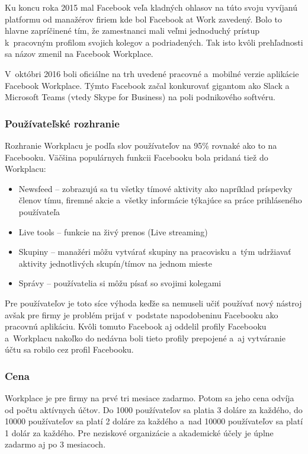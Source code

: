 \indent Ku koncu roka 2015 mal Facebook veľa kladných ohlasov na túto svoju vyvíjanú platformu od manažérov firiem kde bol Facebook at Work zavedený. Bolo to hlavne zapríčinené tím, že zamestnanci mali veľmi jednoduchý prístup k pracovným profilom svojich kolegov a podriadených. Tak isto kvôli prehľadnosti sa názov zmenil na Facebook Workplace.

\indent  V októbri 2016 boli oficiálne na trh uvedené pracovné a mobilné verzie aplikácie Facebook Workplace. Týmto Facebook začal konkurovať gigantom ako Slack a Microsoft Teams (vtedy Skype for Business) na poli podnikového softvéru.
\subsubsection{Používateľské rozhranie}
\indent Rozhranie Workplacu je podľa slov používateľov na 95\% rovnaké ako to na Facebooku. Väčšina populárnych funkcii Facebooku bola pridaná tiež do Workplacu:
\begin{itemize}
    \item Newsfeed – zobrazujú sa tu všetky tímové aktivity ako napríklad príspevky členov tímu, firemné akcie a všetky informácie týkajúce sa práce prihláseného používateľa
    \item Live tools – funkcie na živý prenos (Live streaming)
    \item Skupiny – manažéri môžu vytvárať skupiny na pracovisku a tým udržiavať aktivity jednotlivých skupín/tímov na jednom  mieste
    \item Správy – používatelia si môžu písať so svojimi kolegami
\end{itemize}

\indent Pre používateľov je toto síce výhoda keďže sa nemuseli učiť používať nový nástroj avšak pre firmy je problém prijať v podstate napodobeninu Facebooku ako pracovnú aplikáciu. Kvôli tomuto Facebook aj oddelil profily Facebooku a Workplacu nakoľko do nedávna boli tieto profily prepojené a aj vytváranie účtu sa robilo cez profil Facebooku. 
\subsubsection{Cena}
\indent Workplace je pre firmy na prvé tri mesiace zadarmo. Potom sa jeho cena odvíja od počtu aktívnych účtov. Do 1000 používateľov sa platia 3 doláre za každého, do 10000 používateľov sa platí 2 doláre za každého a nad 10000 používateľov sa platí 1 dolár za každého.  Pre neziskové organizácie a akademické účely je úplne zadarmo aj po 3 mesiacoch.

